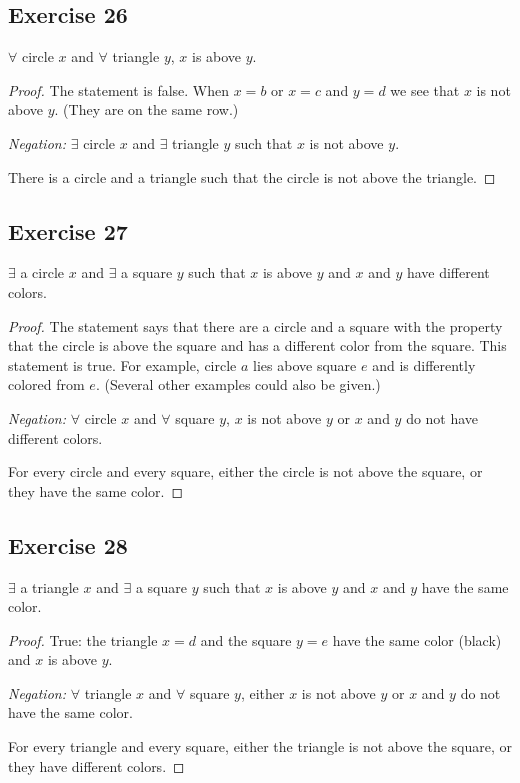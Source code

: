 \documentclass[14pt]{extarticle}
\newcommand{\fa}{\forall}
\newcommand{\te}{\exists}
\begin{document}
\subsection{Exercise 26}
$\fa$ circle $x$ and $\fa$ triangle $y$, $x$ is above $y$.

\begin{proof}
    The statement is false. When $x = b$ or $x = c$ and $y = d$ we see that $x$ is not above $y$. (They are on the same row.)

    {\it Negation:} $\te$ circle $x$ and $\te$ triangle $y$ such that $x$ is not above $y$.

    There is a circle and a triangle such that the circle is not above the triangle.
\end{proof}

\subsection{Exercise 27}
$\te$ a circle $x$ and $\te$ a square $y$ such that $x$ is above $y$ and $x$ and $y$ have different colors.

\begin{proof}
    The statement says that there are a circle and a square with the property that the circle is above the square and has a different color from the square. This statement is true. For example, circle $a$ lies above square $e$ and is differently colored from $e$. (Several other examples could
    also be given.)

    {\it Negation:} $\fa$ circle $x$ and $\fa$ square $y$, $x$ is not above $y$ or $x$ and $y$ do not have different colors.

    For every circle and every square, either the circle is not above the square, or they have the same color.
\end{proof}

\subsection{Exercise 28}
$\te$ a triangle $x$ and $\te$ a square $y$ such that $x$ is above $y$ and $x$ and $y$ have the same color.

\begin{proof}
    True: the triangle $x = d$ and the square $y = e$ have the same color (black) and $x$ is above $y$.

        {\it Negation:} $\fa$ triangle $x$ and $\fa$ square $y$, either $x$ is not above $y$ or $x$ and $y$ do not have the same color.

    For every triangle and every square, either the triangle is not above the square, or they have different colors.
\end{proof}
\end{document}
